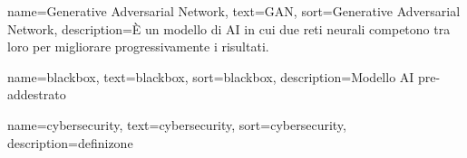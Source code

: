 
 {
    name={Generative Adversarial Network},
    text={GAN},
    sort={Generative Adversarial Network},
    description={È un modello di AI in cui due reti neurali competono tra loro per migliorare progressivamente i risultati.}
}

 {
    name={blackbox},
    text={blackbox},
    sort={blackbox},
    description={Modello AI pre-addestrato}
}

 {
    name={cybersecurity},
    text={cybersecurity},
    sort={cybersecurity},
    description={definizone}
}